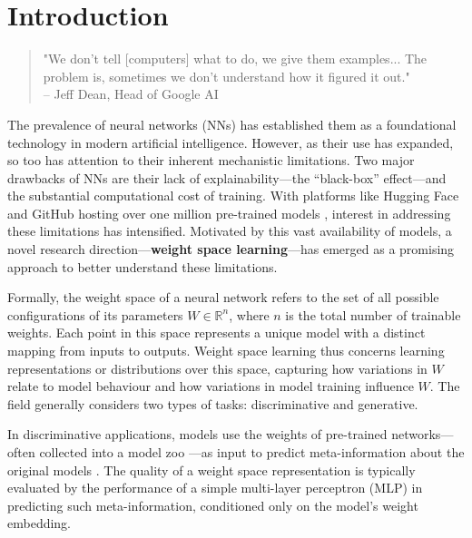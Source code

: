 \graphicspath{{fig/}}

\chapter{Introduction}
\label{chap:introduction}

\begin{quote}
    "We don't tell [computers] what to do, we give them examples... The problem is, sometimes we don't understand how it figured it out."\\ %
    \vspace{0.5em} %
    \hfill -- Jeff Dean, Head of Google AI \cite{Dean2017BlackBox}
\end{quote}

The prevalence of neural networks (NNs) has established them as a foundational technology in modern artificial intelligence. However, as their use has expanded, so too has attention to their inherent mechanistic limitations. Two major drawbacks of NNs are their lack of explainability—the “black-box” effect—and the substantial computational cost of training. With platforms like Hugging Face and GitHub hosting over one million pre-trained models \cite{huggingface2024review}, interest in addressing these limitations has intensified. Motivated by this vast availability of models, a novel research direction—\textbf{weight space learning}—has emerged as a promising approach to better understand these limitations.

Formally, the weight space of a neural network refers to the set of all possible configurations of its parameters \( W \in \mathbb{R}^n \), where \( n \) is the total number of trainable weights. Each point in this space represents a unique model with a distinct mapping from inputs to outputs. Weight space learning thus concerns learning representations or distributions over this space, capturing how variations in \( W \) relate to model behaviour and how variations in model training influence \( W \). The field generally considers two types of tasks: discriminative and generative.

In discriminative applications, models use the weights of pre-trained networks—often collected into a model zoo \cite{schurholt2022modelzoosdatasetdiverse}—as input to predict meta-information about the original models \cite{unterthiner2021predictingneuralnetworkaccuracy}. The quality of a weight space representation is typically evaluated by the performance of a simple multi-layer perceptron (MLP) in predicting such meta-information, conditioned only on the model's weight embedding.

